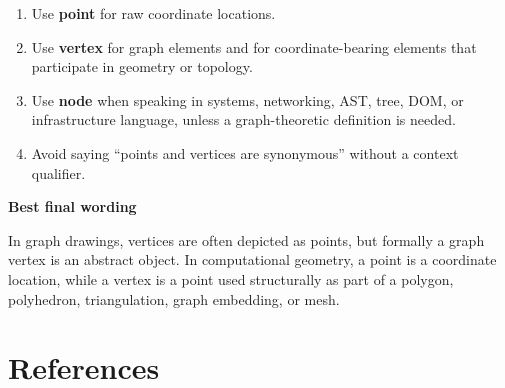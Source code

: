 \documentclass[11pt]{article}
\providecommand{\callout}[2]{%
  \vspace{4pt}%
  \noindent\colorbox{lightaccent}{%
    \parbox{0.965\linewidth}{%
      \textbf{\color{accent}#1}\par
      #2%
    }%
  }%
  \vspace{4pt}%
}
\providecommand{\calloutbox}[2]{\callout{#1}{#2}}
\begin{document}
\begin{enumerate}
  \item Use \textbf{point} for raw coordinate locations.
  \item Use \textbf{vertex} for graph elements and for coordinate-bearing elements that participate in geometry or topology.
  \item Use \textbf{node} when speaking in systems, networking, AST, tree, DOM, or infrastructure language, unless a graph-theoretic definition is needed.
  \item Avoid saying ``points and vertices are synonymous'' without a context qualifier.
\end{enumerate}

\calloutbox{Best final wording}{In graph drawings, vertices are often depicted as points, but formally a graph vertex is an abstract object. In computational geometry, a point is a coordinate location, while a vertex is a point used structurally as part of a polygon, polyhedron, triangulation, graph embedding, or mesh.}

\section{References}
\end{document}
